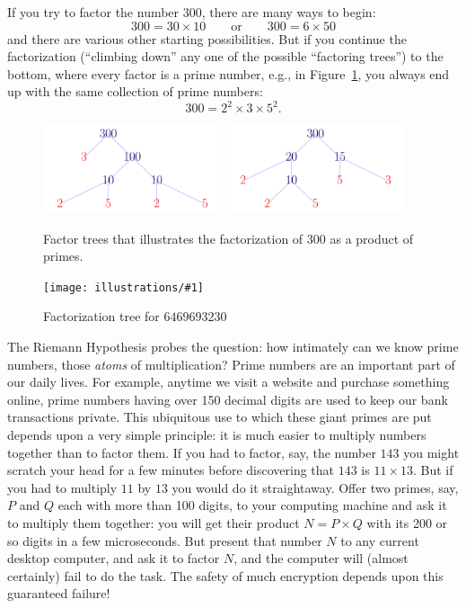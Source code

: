 \documentclass[11pt]{article}
\newcommand{\ill}[3]{ 
   \begin{figure}[htbp]
   \begin{center}
   \texttt{[image: illustrations/\#1]}
   \caption{#3}
   \end{center}
    \end{figure}
}
\theoremstyle{plain}
\theoremstyle{definition}
\numberwithin{equation}{section}
\numberwithin{figure}{section}
\numberwithin{table}{section}
\begin{document}
If you try to factor the number $300$, there are many
ways to begin:
$$
  300= 30\times 10\qquad\text{or}\qquad 300 = 6 \times 50
$$
and there are various other starting possibilities. But if you continue the factorization (``climbing down'' any one of 
the possible ``factoring trees'') to the bottom, where every factor is a prime number, e.g., in
Figure~\ref{fig:factor300},
you always end up with the same collection of prime numbers:                  
                 $$300 = 2^2\times 3\times 5^2.$$   

\begin{figure}
\begin{center}
\includegraphics[width=0.47\textwidth]{illustrations/factor_tree_300_a}
\includegraphics[width=0.47\textwidth]{illustrations/factor_tree_300_b}
\caption{Factor trees that illustrates the factorization of 300 as a product of primes.\label{fig:factor300}}
\end{center}
\end{figure}

\ill{factor_tree_big}{1}{Factorization tree for $6469693230$\label{factor.tree.big}}
 
                        
The Riemann Hypothesis probes the question: how intimately can we know
prime numbers, those {\em atoms} of multiplication?  Prime numbers are
an important part of our daily lives.  For example, anytime we visit a
website and purchase something online, prime numbers having over 150
decimal digits are used to keep our bank transactions private.  This
ubiquitous use to which these giant primes are put depends upon a very
simple principle: it is much easier to multiply numbers together than
to factor them. If you had to factor, say, the number $143$ you might
scratch your head for a few minutes before discovering that $143$ is
$11\times 13$. But if you had to multiply $11$ by $13$ you would do it
straightaway.  Offer two primes, say, $P$ and $Q$ each with more than
100 digits, to your computing machine and ask it to multiply them
together: you will get their product $N = P\times Q$ with its 200 or
so digits in a few microseconds. But present that number $N$ to any
current desktop computer, and ask it to factor $N$, and the computer
will (almost certainly) fail to do the task. The safety of much
encryption depends upon this guaranteed failure!
\end{document}

